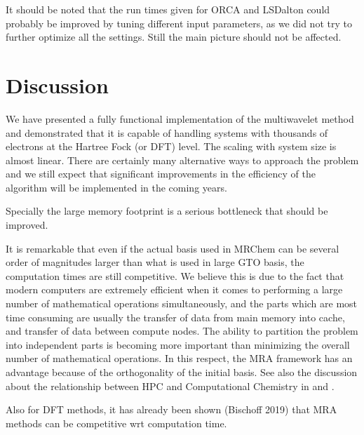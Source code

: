 \documentclass{article}
\begin{document}
It should be noted that the run times given for ORCA and LSDalton could probably be improved by tuning different input parameters, as we did not try to further optimize all the settings. Still the main picture should not be affected.





\section{Discussion}
We have presented a fully functional implementation of the multiwavelet method and demonstrated that it is capable of handling systems with thousands of electrons at the Hartree Fock (or DFT) level. The scaling with system size is almost linear. There are certainly many alternative ways to approach the problem and we still expect that significant improvements in the efficiency of the algorithm will be implemented in the coming years. 

Specially the large memory footprint is a serious bottleneck that should be improved. %

It is remarkable that even if the actual basis used in MRChem can be several order of magnitudes larger than what is used in large GTO basis, the computation times are still competitive. We believe this is due to the fact that modern computers are extremely efficient when it comes to performing a large number of mathematical operations simultaneously, and the parts which are most time consuming are usually the transfer of data from main memory into cache, and transfer of data between compute nodes. The ability to partition the problem into independent parts is becoming more important than minimizing the overall number of mathematical operations. In this respect, the MRA framework has an advantage because of the orthogonality of the initial basis. See also the discussion about the relationship between HPC and Computational Chemistry in \cite{penchoff2021} and \cite{ratcliff2016}.

Also for DFT methods, it has already been shown (Bischoff 2019) that MRA methods can be competitive wrt computation time.

\end{document}
